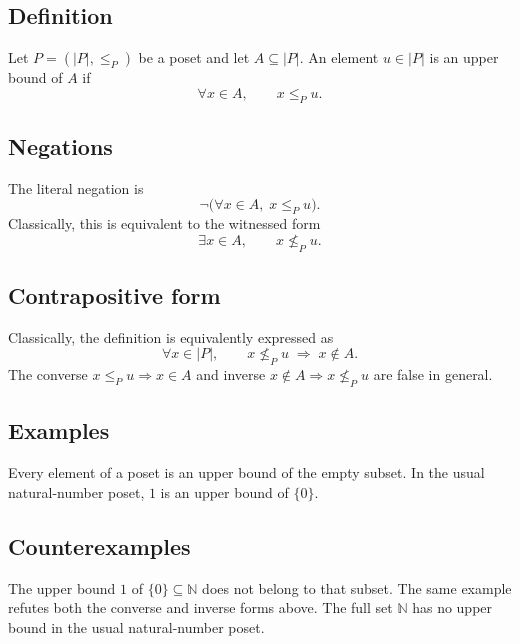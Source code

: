 \subsection*{Definition}
Let \(P=(|P|,\leq_P)\) be a poset and let \(A\subseteq |P|\). An element \(u\in |P|\) is an upper bound of \(A\) if
\[
  \forall x\in A,\qquad x\leq_P u.
\]

\subsection*{Negations}
The literal negation is
\[
  \neg\bigl(\forall x\in A,\;x\leq_P u\bigr).
\]
Classically, this is equivalent to the witnessed form
\[
  \exists x\in A,\qquad x\nleq_P u.
\]

\subsection*{Contrapositive form}
Classically, the definition is equivalently expressed as
\[
  \forall x\in |P|,\qquad x\nleq_P u\;\Longrightarrow\;x\notin A.
\]
The converse \(x\leq_P u\Rightarrow x\in A\) and inverse \(x\notin A\Rightarrow x\nleq_P u\) are false in general.

\subsection*{Examples}
Every element of a poset is an upper bound of the empty subset. In the usual natural-number poset, \(1\) is an upper bound of \(\{0\}\).

\subsection*{Counterexamples}
The upper bound \(1\) of \(\{0\}\subseteq\mathbb{N}\) does not belong to that subset. The same example refutes both the converse and inverse forms above. The full set \(\mathbb{N}\) has no upper bound in the usual natural-number poset.
